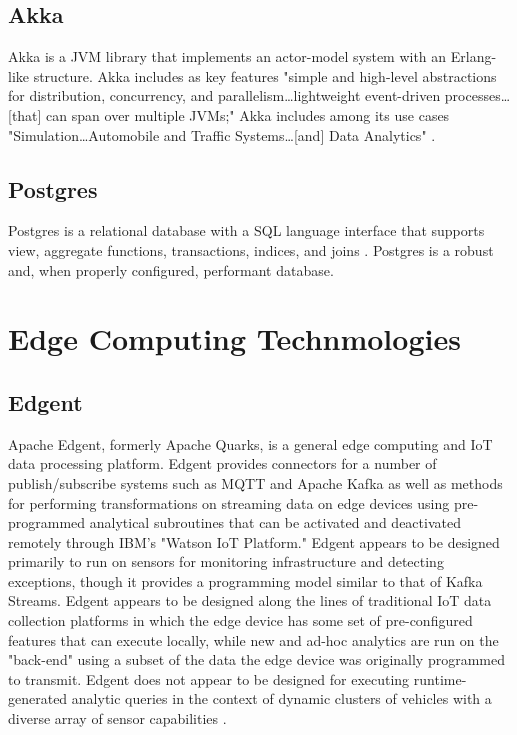 \documentclass{thesis}
\begin{document}
    \subsection{Akka}
        Akka is a JVM library that implements an actor-model system with an Erlang-like structure.
        Akka includes as key features "simple and high-level abstractions for distribution,
        concurrency, and parallelism\dots lightweight event-driven processes\dots[that] can span
        over multiple JVMs;" Akka includes among its use cases "Simulation\dots Automobile and
        Traffic Systems\dots [and] Data Analytics" \cite{akka}. %
    \subsection{Postgres}
        Postgres is a relational database with a SQL language interface that supports view, aggregate
        functions, transactions, indices, and joins \cite{postgres}. Postgres is a robust and, when
        properly configured, performant database.
    \section{Edge Computing Technmologies}
    \subsection{Edgent}
        Apache Edgent, formerly Apache Quarks, is a general edge computing and IoT data processing
        platform. Edgent provides connectors for a number of publish/subscribe systems such as 
        MQTT and Apache Kafka as well as methods for performing transformations on streaming
        data on edge devices using pre-programmed analytical subroutines that can be activated and
        deactivated remotely through IBM's "Watson IoT Platform." Edgent appears to be designed
        primarily to run on sensors for monitoring infrastructure and detecting exceptions, though
        it provides a programming model similar to that of Kafka Streams. Edgent appears to be 
        designed along the lines of traditional IoT data collection platforms in which the edge
        device has some set of pre-configured features that can execute locally, while new and
        ad-hoc analytics are run on the "back-end" using a subset of the data the edge device
        was originally programmed to transmit. Edgent does not appear to be designed for executing
        runtime-generated analytic queries in the context of dynamic clusters of vehicles with a diverse
        array of sensor capabilities \cite{edgent}.
\end{document}
